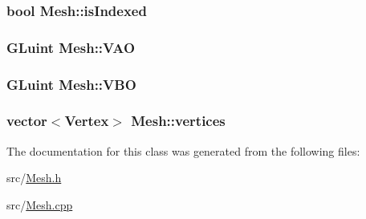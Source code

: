 \subsubsection[{\texorpdfstring{is\+Indexed}{isIndexed}}]{\setlength{\rightskip}{0pt plus 5cm}bool Mesh\+::is\+Indexed\hspace{0.3cm}{\ttfamily [protected]}}\hypertarget{class_mesh_a942e224876dfbfb383aed5b4b361e36b}{}\label{class_mesh_a942e224876dfbfb383aed5b4b361e36b}
\subsubsection[{\texorpdfstring{V\+AO}{VAO}}]{\setlength{\rightskip}{0pt plus 5cm}G\+Luint Mesh\+::\+V\+AO\hspace{0.3cm}{\ttfamily [protected]}}\hypertarget{class_mesh_a09b989b9d4df8ae595d7e80e091a4a5b}{}\label{class_mesh_a09b989b9d4df8ae595d7e80e091a4a5b}
\subsubsection[{\texorpdfstring{V\+BO}{VBO}}]{\setlength{\rightskip}{0pt plus 5cm}G\+Luint Mesh\+::\+V\+BO\hspace{0.3cm}{\ttfamily [protected]}}\hypertarget{class_mesh_a0d28b2c6fee628a13f43cae3f858569b}{}\label{class_mesh_a0d28b2c6fee628a13f43cae3f858569b}
\subsubsection[{\texorpdfstring{vertices}{vertices}}]{\setlength{\rightskip}{0pt plus 5cm}vector$<${\bf Vertex}$>$ Mesh\+::vertices\hspace{0.3cm}{\ttfamily [protected]}}\hypertarget{class_mesh_abe5c05c224e47ba1e8b6393759798a9b}{}\label{class_mesh_abe5c05c224e47ba1e8b6393759798a9b}


The documentation for this class was generated from the following files\+:\begin{DoxyCompactItemize}
\item 
src/\hyperlink{_mesh_8h}{Mesh.\+h}\item 
src/\hyperlink{_mesh_8cpp}{Mesh.\+cpp}\end{DoxyCompactItemize}
